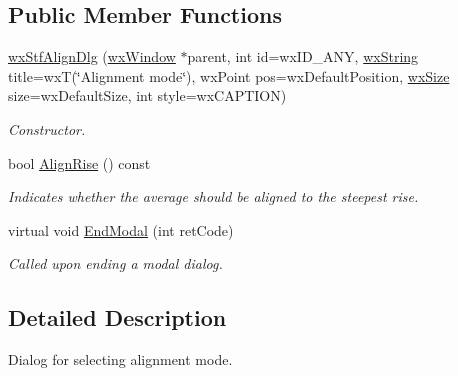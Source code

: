 \subsection*{Public Member Functions}
\begin{DoxyCompactItemize}
\item 
\hyperlink{classwxStfAlignDlg_a91fcede6329a5707fa63575f44f46d8d}{wxStfAlignDlg} (\hyperlink{classwxWindow}{wxWindow} $\ast$parent, int id=wxID\_\-ANY, \hyperlink{classwxString}{wxString} title=wxT(\char`\"{}Alignment mode\char`\"{}), wxPoint pos=wxDefaultPosition, \hyperlink{classwxSize}{wxSize} size=wxDefaultSize, int style=wxCAPTION)
\begin{DoxyCompactList}\small\item\em Constructor. \item\end{DoxyCompactList}\item 
bool \hyperlink{classwxStfAlignDlg_af63c6dfa13c434175a37c965c4d7bdc5}{AlignRise} () const 
\begin{DoxyCompactList}\small\item\em Indicates whether the average should be aligned to the steepest rise. \item\end{DoxyCompactList}\item 
virtual void \hyperlink{classwxStfAlignDlg_a385cdd58c4f99b5a2ec7917dc5ac5877}{EndModal} (int retCode)
\begin{DoxyCompactList}\small\item\em Called upon ending a modal dialog. \item\end{DoxyCompactList}\end{DoxyCompactItemize}


\subsection{Detailed Description}
Dialog for selecting alignment mode. 

